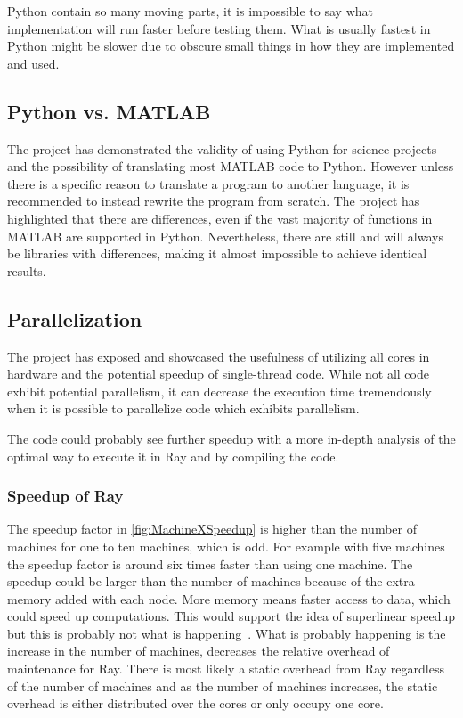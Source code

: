 \documentclass[12pt, a4paper]{article}
\begin{document}
Python contain so many moving parts, it is impossible to say what implementation will run faster before testing them.
What is usually fastest in Python might be slower due to obscure small things in how they are implemented and used.

\subsection{Python vs. MATLAB}

The project has demonstrated the validity of using Python for science projects and the possibility of translating most MATLAB code to Python.
However unless there is a specific reason to translate a program to another language, it is recommended to instead rewrite the program from scratch.
The project has highlighted that there are differences, even if the vast majority of functions in MATLAB are supported in Python.
Nevertheless, there are still and will always be libraries with differences, making it almost impossible to achieve identical results.

\subsection{Parallelization}

The project has exposed and showcased the usefulness of utilizing all cores in hardware and the potential speedup of single-thread code.
While not all code exhibit potential parallelism, it can decrease the execution time tremendously when it is possible to parallelize code which exhibits parallelism.

The code could probably see further speedup with a more in-depth analysis of the optimal way to execute it in Ray and by compiling the code.

\subsubsection{Speedup of Ray}\label{RaySpeedup}

The speedup factor in \cref{fig:MachineXSpeedup} is higher than the number of machines for one to ten machines, which is odd.
For example with five machines the speedup factor is around six times faster than using one machine.
The speedup could be larger than the number of machines because of the extra memory added with each node.
More memory means faster access to data, which could speed up computations.
This would support the idea of superlinear speedup but this is probably not what is happening~\cite{superlinearSPEED}.
What is probably happening is the increase in the number of machines, decreases the relative overhead of maintenance for Ray.
There is most likely a static overhead from Ray regardless of the number of machines and as the number of machines increases, the static overhead is either distributed over the cores or only occupy one core.
\end{document}
